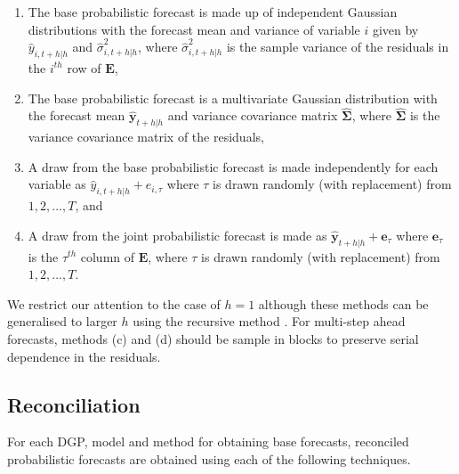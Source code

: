 \documentclass[12pt]{article}
\theoremstyle{definition}
\begin{document}
\begin{enumerate}[label=(\alph*)]
	\item The base probabilistic forecast is made up of independent Gaussian distributions with the forecast mean and variance of variable $i$ given by $\hat{y}_{i,t+h|h}$ and $\hat{\sigma}^2_{i,t+h|h}$, where $\hat{\sigma}^2_{i,t+h|h}$ is the sample variance of the residuals in the $i^{th}$ row of $\bm{E}$,
	\item The base probabilistic forecast is a multivariate Gaussian distribution with the forecast mean $\hat{\bm{y}}_{t+h|h}$ and variance covariance matrix $\hat{\bm\Sigma}$, where $\hat{\bm\Sigma}$ is the variance covariance matrix of the residuals,
	\item A draw from the base probabilistic forecast is made independently for each variable as $\hat{y}_{i,t+h|h}+e_{i,\tau}$ where $\tau$ is drawn randomly (with replacement) from $1,2,\ldots, T$, and
	\item A draw from the joint probabilistic forecast is made as $\hat{\bm y}_{t+h|h}+\bm{e}_{\tau}$ where $\bm{e}_{\tau}$ is the $\tau^{th}$ column of $\bm{E}$, where $\tau$ is drawn randomly (with replacement) from $1,2,\ldots, T$.
\end{enumerate}

We restrict our attention to the case of $h=1$ although these methods can be generalised to larger $h$ using the recursive method \citep{FPP2018}.  For multi-step ahead forecasts, methods (c) and (d) should be sample in blocks to preserve serial dependence in the residuals.

\subsection{Reconciliation}

For each DGP, model and method for obtaining base forecasts, reconciled probabilistic forecasts are obtained using each of the following techniques.
\end{document}
